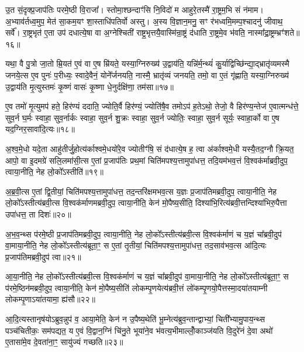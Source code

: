 उ॒त सं॒दृक्प्र॒जाप॑तिः परमे॒ष्ठी वि॒राजा᳚। स्तोमा॒श्छन्दाꣳ॑सि नि॒विदो॑ म आहुरे॒तस्मै॑ रा॒ष्ट्रम॒भि सं न॑माम। अ॒भ्याव॑र्तध्व॒मुप॒ मेत॑ सा॒कम॒यꣳ शा॒स्ताधि॑पतिर्वो अस्तु। अ॒स्य वि॒ज्ञान॒मनु॒ सꣳ र॑भध्वमि॒मम्प॒श्चादनु॑ जीवाथ॒ सर्वे᳚। रा॒ष्ट्रभृत॑ ए॒ता उप॑ दधात्ये॒षा वा अ॒ग्नेश्चिती॑ राष्ट्र॒भृत्तयै॒वास्मि॑न्रा॒ष्ट्रं द॑धाति रा॒ष्ट्रमे॒व भ॑वति॒ नास्मा᳚द्रा॒ष्ट्रम्भ्रꣳ॑शते॥१६॥

{\anuvakamend[{भा॒ग॒धेय॒ञ्जुह्व॑ति पर॒मा रा॒ष्ट्रन्द॑धाति स॒प्त च॑॥४॥}]}

यथा॒ वै पु॒त्रो जा॒तो म्रि॒यत॑ ए॒वं वा ए॒ष म्रि॑यते॒ यस्या॒ग्निरुख्य॑ उ॒द्वाय॑ति॒ यन्नि॑र्म॒न्थ्यं॑ कु॒र्याद्विच्छि॑न्द्या॒द्भ्रातृ॑व्यमस्मै जनये॒त्स ए॒व पुनः॑ प॒रीध्यः॒ स्वादे॒वैनं॒ योने᳚र्जनयति॒ नास्मै॒ भ्रातृ॑व्यं जनयति॒ तमो॒ वा ए॒तं गृ॑ह्णाति॒ यस्या॒ग्निरुख्य॑ उ॒द्वाय॑ति मृ॒त्युस्तमः॑ कृ॒ष्णं वासः॑ कृ॒ष्णा धे॒नुर्दक्षि॑णा॒ तम॑सा॥१७॥

ए॒व तमो॑ मृ॒त्युमप॑ हते॒ हिर॑ण्यं ददाति॒ ज्योति॒र्वै हिर॑ण्यं॒ ज्योति॑षै॒व तमो\-ऽप॑ ह॒ते\-ऽथो॒ तेजो॒ वै हिर॑ण्य॒न्तेज॑ ए॒वात्मन्ध॑त्ते॒ सुव॒र्न घ॒र्मः स्वाहा॒ सुव॒र्नार्कः स्वाहा॒ सुव॒र्न शु॒क्रः स्वाहा॒ सुव॒र्न ज्योतिः॒ स्वाहा॒ सुव॒र्न सूर्यः॒ स्वाहा॒र्को वा ए॒ष यद॒ग्निर॒सावा॑दि॒त्यः॥१८॥

अ॒श्व॒मे॒धो यदे॒ता आहु॑तीर्जु॒होत्य॑र्काश्वमे॒धयो॑रे॒व ज्योतीꣳ॑षि॒ सं द॑धात्ये॒ष ह॒ त्वा अ॑र्काश्वमे॒धी यस्यै॒तद॒ग्नौ क्रि॒यत॒ आपो॒ वा इ॒दमग्रे॑ सलि॒लमा॑सी॒त्स ए॒तां प्र॒जाप॑तिः प्रथ॒मां चिति॑मपश्य॒त्तामुपा॑धत्त॒ तदि॒यम॑भव॒त्तं वि॒श्वक॑र्माब्रवी॒दुप॒ त्वाया॒नीति॒ नेह लो॒को᳚\-ऽस्तीति॑॥१९॥

अ॒ब्र॒वी॒त्स ए॒तां द्वि॒तीयां॒ चिति॑मपश्य॒त्तामुपा॑धत्त॒ तद॒न्तरि॑क्षमभव॒त्स य॒ज्ञः प्र॒जाप॑तिमब्रवी॒दुप॒ त्वाया॒नीति॒ नेह लो॒को᳚\-ऽस्तीत्य॑ब्रवी॒त्स वि॒श्वक॑र्माणमब्रवी॒दुप॒ त्वाया॒नीति॒ केन॑ मो॒पैष्य॒सीति॒ दिश्या॑भि॒रित्य॑ब्रवी॒त्तन्दिश्या॑भिरु॒पैत्ता उपा॑धत्त॒ ता दिशः॑॥२०॥

अ॒भ॒व॒न्थ्स प॑रमे॒ष्ठी प्र॒जाप॑तिमब्रवी॒दुप॒ त्वाया॒नीति॒ नेह लो॒को᳚\-ऽस्तीत्य॑ब्रवी॒त्स वि॒श्वक॑र्माणं च य॒ज्ञं चा᳚ब्रवी॒दुप॑ वा॒माया॒नीति॒ नेह लो॒को᳚\-ऽस्तीत्य॑ब्रूता॒ꣳ॒ स ए॒तां तृ॒तीयां॒ चिति॑मपश्य॒त्तामुपा॑धत्त॒ तद॒साव॑भव॒त्स आ॑दि॒त्यः प्र॒जाप॑तिमब्रवी॒दुप॑ त्वा॥२१॥

आ॒या॒नीति॒ नेह लो॒को᳚\-ऽस्तीत्य॑ब्रवी॒त्स वि॒श्वक॑र्माणं च य॒ज्ञं चा᳚ब्रवी॒दुप॑ वा॒माया॒नीति॒ नेह लो॒को᳚\-ऽस्तीत्य॑ब्रूता॒ꣳ॒ स प॑रमे॒ष्ठिन॑मब्रवी॒दुप॒ त्वाया॒नीति॒ केन॑ मो॒पैष्य॒सीति॑ लोकम्पृ॒णयेत्य॑ब्रवी॒त्तं लो॑कम्पृ॒णयो॒पैत्तस्मा॒दया॑तयाम्नी लोकम्पृ॒णा\-ऽया॑तयामा॒ ह्य॑सौ॥२२॥

आ॒दि॒त्यस्तानृष॑यो\-ऽब्रुव॒न्नुप॑ व॒ आया॒मेति॒ केन॑ न उ॒पैष्य॒थेति॑ भू॒म्नेत्य॑ब्रुव॒न्तान्द्वाभ्यां॒ चिती᳚भ्यामु॒पाय॒न्थ्स पञ्च॑चितीकः॒ सम॑पद्यत॒ य ए॒वं वि॒द्वान॒ग्निं चि॑नु॒ते भूया॑ने॒व भ॑वत्य॒भीमाल्लोँ॒काञ्ज॑यति वि॒दुरे॑नं दे॒वा अथो॑ ए॒तासा॑मे॒व दे॒वता॑ना॒ꣳ॒ सायु॑ज्यं गच्छति॥२३॥


